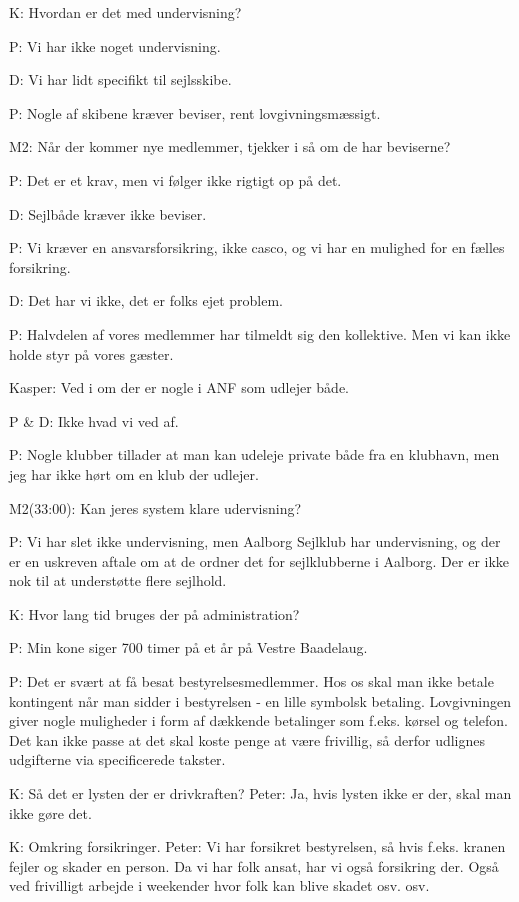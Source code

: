 K: Hvordan er det med undervisning?

P: Vi har ikke noget undervisning.

D: Vi har lidt specifikt til sejlsskibe.

P: Nogle af skibene kræver beviser, rent lovgivningsmæssigt. 

M2: Når der kommer nye medlemmer, tjekker i så om de har beviserne?

P: Det er et krav, men vi følger ikke rigtigt op på det.

D: Sejlbåde kræver ikke beviser.

P: Vi kræver en ansvarsforsikring, ikke casco, og vi har en mulighed for en fælles forsikring.

D: Det har vi ikke, det er folks ejet problem.

P: Halvdelen af vores medlemmer har tilmeldt sig den kollektive. Men vi kan ikke holde styr på vores gæster.

Kasper: Ved i om der er nogle i ANF som udlejer både.

P \& D: Ikke hvad vi ved af.

P: Nogle klubber tillader at man kan udeleje private både fra en klubhavn, men jeg har ikke hørt om en klub der udlejer.


M2(33:00): Kan jeres system klare udervisning?

P: Vi har slet ikke undervisning, men Aalborg Sejlklub har undervisning, og der er en uskreven aftale om at de ordner det for sejlklubberne i Aalborg. Der er ikke nok til at understøtte flere sejlhold.


K: Hvor lang tid bruges der på administration?

P: Min kone siger 700 timer på et år på Vestre Baadelaug.

P: Det er svært at få besat bestyrelsesmedlemmer. Hos os skal man ikke betale kontingent når man sidder i bestyrelsen - en lille symbolsk betaling. Lovgivningen giver nogle muligheder i form af dækkende betalinger som f.eks. kørsel og telefon. Det kan ikke passe at det skal koste penge at være frivillig, så derfor udlignes udgifterne via specificerede takster.

K: Så det er lysten der er drivkraften? Peter: Ja, hvis lysten ikke er der, skal man ikke gøre det.

K: Omkring forsikringer. Peter: Vi har forsikret bestyrelsen, så hvis f.eks. kranen fejler og skader en person. Da vi har folk ansat, har vi også forsikring der. Også ved frivilligt arbejde i weekender hvor folk kan blive skadet osv. osv.

